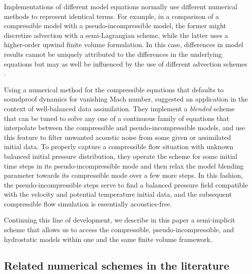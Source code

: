 \documentclass{ametsoc}
\theoremstyle{definition}
\begin{document}
Implementations of different model equations normally use different numerical methods to represent identical terms. For example, in a comparison of a compressible model with a pseudo-incompressible model, the former might discretize advection with a semi-Lagrangian scheme, while the latter uses a higher-order upwind finite volume formulation. In this case, differences in model results cannot be uniquely attributed to the differences in the underlying equations but may as well be influenced by the use of different advection schemes \citep[see][for further examples]{SmolarkiewiczDoernbrack2007,BenacchioEtAl2014}.

Using a numerical method for the compressible equations that defaults to soundproof dynamics for vanishing Mach number, \citet{BenacchioEtAl2014} suggested an application in the context of well-balanced data assimilation. They implement a \textit{blended} scheme that can be tuned to solve any one of a continuous family of equations that interpolate between the compressible and pseudo-incompressible models, and use this feature to filter unwanted acoustic noise from some given or assimilated initial data. To properly capture a compressible flow situation with unknown balanced initial pressure distribution, they operate the scheme for some initial time steps in its pseudo-incompressible mode and then relax the model blending parameter towards its compressible mode over a few more steps. In this fashion, the pseudo-incompressible steps serve to find a balanced pressure field compatible with the velocity and potential temperature initial data, and the subsequent compressible flow simulation is essentially acoustics-free.

Continuing this line of development, we describe in this paper a semi-implicit scheme that allows us to access the compressible, pseudo-incompressible, and hydrostatic models within one and the same finite volume framework. 


\subsection{Related numerical schemes in the literature}
\end{document}
